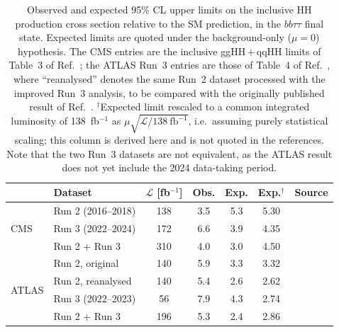 \begin{table}[t]
\centering
\begin{tabular}{llccccl}
\toprule
 & Dataset & $\mathcal{L}$ [fb$^{-1}$] & Obs. & Exp. & Exp.$^{\dagger}$ & Source \\
\midrule
\multirow{3}{*}{CMS}
  & Run 2 (2016--2018)         & 138 & 3.5 & 5.3 & 5.30 & \cite{CMS-PAS-HIG-25-008} \\
  & Run 3 (2022--2024)         & 172 & 6.6 & 3.9 & 4.35 & \cite{CMS-PAS-HIG-25-008} \\
  & Run 2 + Run 3              & 310 & 4.0 & 3.0 & 4.50 & \cite{CMS-PAS-HIG-25-008} \\
\midrule
\multirow{4}{*}{ATLAS}
  & Run 2, original            & 140 & 5.9 & 3.3 & 3.32 & \cite{ATLAS-HH-bbtautau-Run2} \\
  & Run 2, reanalysed          & 140 & 5.4 & 2.6 & 2.62 & \cite{ATLAS-HH-bbtautau-Run3} \\
  & Run 3 (2022--2023)         &  56 & 7.9 & 4.3 & 2.74 & \cite{ATLAS-HH-bbtautau-Run3} \\
  & Run 2 + Run 3              & 196 & 5.3 & 2.4 & 2.86 & \cite{ATLAS-HH-bbtautau-Run3} \\
\bottomrule
\end{tabular}
\caption[Comparison of CMS and ATLAS upper limits in $HH\to bb\tau\tau$]{%
Observed and expected 95\% CL upper limits on the inclusive HH production cross
section relative to the SM prediction, in the $bb\tau\tau$ final state. Expected
limits are quoted under the background-only ($\mu = 0$) hypothesis. The CMS
entries are the inclusive ggHH\,$+$\,qqHH limits of Table~3 of
Ref.~\cite{CMS-PAS-HIG-25-008}; the ATLAS Run~3 entries are those of Table~4 of
Ref.~\cite{ATLAS-HH-bbtautau-Run3}, where ``reanalysed'' denotes the same Run~2
dataset processed with the improved Run~3 analysis, to be compared with the
originally published result of Ref.~\cite{ATLAS-HH-bbtautau-Run2}.
$^{\dagger}$Expected limit rescaled to a common integrated luminosity of
138~fb$^{-1}$ as $\mu\sqrt{\mathcal{L}/138~\mathrm{fb}^{-1}}$, i.e.\ assuming
purely statistical scaling; this column is derived here and is not quoted in the
references. Note that the two Run~3 datasets are not equivalent, as the ATLAS
result does not yet include the 2024 data-taking period.}
\label{tab:hh_bbtautau_limits}
\end{table}
